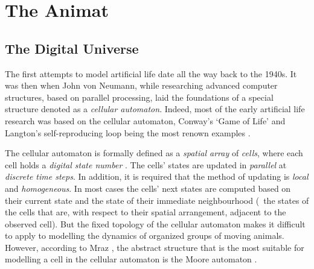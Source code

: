 









\chapter{The Animat}
\label{ch:animat}


\section{The Digital Universe}
The first attempts to model artificial life date all the way back to the 1940s. It was then when John von Neumann, while researching advanced computer structures, based on parallel processing, laid the foundations of a special structure denoted as a \emph{cellular automaton}. Indeed, most of the early artificial life research was based on the cellular automaton, Conway's `Game of Life' \cite{gardner:1970} and Langton's self-reproducing loop \cite{langton:1984} being the most renown examples \cite{adami:1998,emmenche:1994,rucker:1993}.

The cellular automaton is formally defined as a \emph{spatial array} of \emph{cells}, where each cell holds a \emph{digital state number} \cite{rucker:1993}. The cells' states are updated in \emph{parallel} at \emph{discrete time steps}. In addition, it is required that the method of updating is \emph{local} and \emph{homogeneous}. In most cases the cells' next states are computed based on their current state and the state of their immediate neighbourhood (\ie\ the states of the cells that are, with respect to their spatial arrangement, adjacent to the observed cell). But the fixed topology of the cellular automaton makes it difficult to apply to modelling the dynamics of organized groups of moving animals. However, according to Mraz \cite{mraz:2000}, the abstract structure that is the most suitable for modelling a cell in the cellular automaton is the Moore automaton \cite{kohavi:1978}. 

